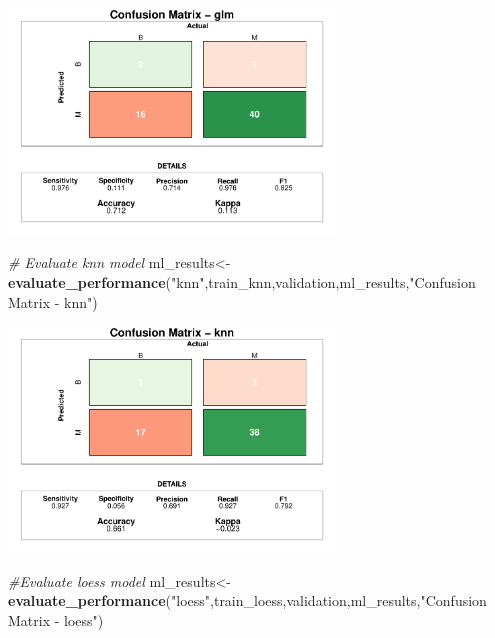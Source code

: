\documentclass[]{article}
\newenvironment{Shaded}{\begin{snugshade}}{\end{snugshade}}
\newcommand{\CommentTok}[1]{\textcolor[rgb]{0.56,0.35,0.01}{\textit{#1}}}
\newcommand{\KeywordTok}[1]{\textcolor[rgb]{0.13,0.29,0.53}{\textbf{#1}}}
\newcommand{\NormalTok}[1]{#1}
\newcommand{\StringTok}[1]{\textcolor[rgb]{0.31,0.60,0.02}{#1}}
\begin{document}
\begin{center}
\includegraphics[width=0.65\textwidth]{LiverDisease_files/figure-latex/unnamed-chunk-39-1.pdf}
\end{center}

\begin{Shaded}
\begin{Highlighting}[]
\CommentTok{# Evaluate knn model}
\NormalTok{ml_results<-}\KeywordTok{evaluate_performance}\NormalTok{(}\StringTok{"knn"}\NormalTok{,train_knn,validation,ml_results,}\StringTok{"Confusion Matrix - knn"}\NormalTok{)}
\end{Highlighting}
\end{Shaded}

\begin{center}
\includegraphics[width=0.65\textwidth]{LiverDisease_files/figure-latex/unnamed-chunk-40-1.pdf}
\end{center}

\begin{Shaded}
\begin{Highlighting}[]
\CommentTok{#Evaluate loess model}
\NormalTok{ml_results<-}\KeywordTok{evaluate_performance}\NormalTok{(}\StringTok{"loess"}\NormalTok{,train_loess,validation,ml_results,}\StringTok{"Confusion Matrix - loess"}\NormalTok{)}
\end{Highlighting}
\end{Shaded}
\end{document}
